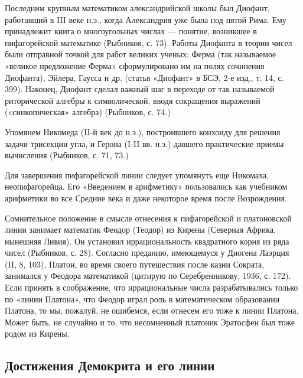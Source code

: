 Последним  крупным  математиком  александрийской  школы  был  Диофант,
работавший в III веке н.э., когда Александрия уже была под пятой Рима.
Ему принадлежит книга о многоугольных  числах --- понятие, возникшее в
пифагорейской математике  (Рыбников, с. 73). Работы  Диофанта в теории
чисел  были отправной  точкой  для работ  великих  ученых: Ферма  (так
называемое  «великое предложение  Ферма»  сформулировано  им на  полях
сочинения Диофанта), Эйлера, Гаусса и др. (статья «Диофант» в БСЭ, 2-е
изд., т. 14, с. 399). Наконец, Диофант сделал важный шаг в переходе от
так называемой риторической алгебры  к символической, вводя сокращения
выражений («синкопическая» алгебра) (Рыбников, с. 74.)

Упомянем  Никомеда  (II-й  век  до н.э.),  построившего  конхоиду  для
решения  задачи  трисекции угла,  и  Герона  (I-II вв.  н.э.)  давшего
практические приемы вычисления (Рыбников, с. 71, 73.)

Для  завершения пифагорейской  линии следует  упомянуть еще  Никомаха,
неопифагорейца.   Его  «Введением   в  арифметику»   пользовались  как
учебником арифметики во все Средние  века и даже некоторое время после
Возрождения.

Сомнительное   положение  в   смысле  отнесения   к  пифагорейской   и
платоновской  линии  занимает  математик  Феодор  (Теодор)  из  Кирены
(Северная  Африка,  нынешняя  Ливия).  Он  установил  иррациональность
квадратного корня из ряда чисел  (Рыбников, с. 28). Согласно преданию,
имеющемуся у  Диогена Лаэрция  (II, 8, 103),  Платон, во  время своего
путешествия  после  казни  Сократа, занимался  у  Феодора  математикой
(цитирую по Серебренникову, 1936, с. 172). Если принять в соображение,
что иррациональные  числа разрабатывались  только по  «линии Платона»,
что Феодор  играл роль  в математическом  образовании Платона,  то мы,
пожалуй, не  ошибемся, если  отнесем его тоже  к линии  Платона. Может
быть, не  случайно и то,  что несомненный платоник Эратосфен  был тоже
родом из Кирены.

\subsection{Достижения Демокрита и его линии}

